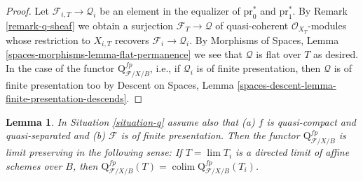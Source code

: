 \documentclass{stacks-project}
\theoremstyle{plain}
\newtheorem{lemma}[subsection]{Lemma}
\theoremstyle{definition}
\theoremstyle{remark}
\numberwithin{equation}{subsection}
\def\lim{\mathop{\mathrm{lim}}\nolimits}
\def\colim{\mathop{\mathrm{colim}}\nolimits}
\begin{document}
\begin{proof}
Let $\mathcal{F}_{i, T} \to \mathcal{Q}_i$ be an element in the equalizer
of $\text{pr}_0^*$ and $\text{pr}_1^*$. By Remark \ref{remark-q-sheaf}
we obtain a surjection $\mathcal{F}_T \to \mathcal{Q}$ of quasi-coherent
$\mathcal{O}_{X_T}$-modules whose restriction to $X_{i, T}$ recovers
$\mathcal{F}_i \to \mathcal{Q}_i$.
By Morphisms of Spaces, Lemma \ref{spaces-morphisms-lemma-flat-permanence}
we see that $\mathcal{Q}$ is flat over $T$ as desired.
In the case of the functor $\text{Q}^{fp}_{\mathcal{F}/X/B}$, i.e.,
if $\mathcal{Q}_i$ is of finite presentation, then
$\mathcal{Q}$ is of finite presentation too by
Descent on Spaces, Lemma
\ref{spaces-descent-lemma-finite-presentation-descends}.
\end{proof}

\begin{lemma}
\label{lemma-q-limit-preserving}
In Situation \ref{situation-q} assume also that
(a) $f$ is quasi-compact and quasi-separated and
(b) $\mathcal{F}$ is of finite presentation.
Then the functor $\text{Q}^{fp}_{\mathcal{F}/X/B}$
is limit preserving in the following sense: If $T = \lim T_i$ is a
directed limit of affine schemes over $B$, then
$\text{Q}^{fp}_{\mathcal{F}/X/B}(T) =
\colim \text{Q}^{fp}_{\mathcal{F}/X/B}(T_i)$.
\end{lemma}
\end{document}
